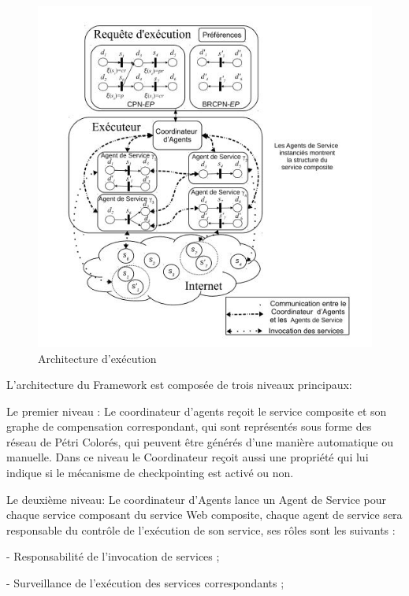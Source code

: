 \begin{figure}[H]
\begin{center}
\includegraphics[width=1\linewidth]{images/architecture Frmwork.jpg}
\end{center}
\caption{Architecture d'exécution \cite{1}}
\label{fig:4}
\end{figure}


L’architecture du Framework est composée de trois niveaux principaux:

Le premier niveau : Le coordinateur d’agents reçoit le service composite et son graphe de compensation correspondant, qui sont représentés sous forme des réseau de Pétri Colorés, qui peuvent être générés d'une manière automatique ou manuelle.
Dans ce niveau le Coordinateur reçoit aussi une propriété qui lui indique si le mécanisme de checkpointing est activé ou non.

Le deuxième niveau: Le coordinateur d'Agents lance un Agent de Service pour chaque service composant du service Web composite, chaque agent de service sera responsable du contrôle de l'exécution de son service, ses rôles sont les suivants \cite{1}:

    - Responsabilité de l'invocation de services ;

    - Surveillance de l'exécution des services correspondants ;
    
